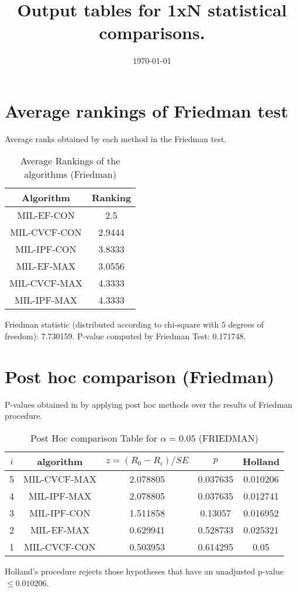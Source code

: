 \documentclass[a4paper,10pt]{article}
\title{Output tables for 1xN statistical comparisons.}
\author{}
\date{\today}
\begin{document}
\begin{landscape}
\pagestyle{empty}
\maketitle
\thispagestyle{empty}

\section{Average rankings of Friedman test}


Average ranks obtained by each method in the Friedman test.

\begin{table}[!htp]
\centering
\begin{tabular}{|c|c|}\hline
Algorithm&Ranking\\\hline
MIL-EF-CON&2.5\\MIL-CVCF-CON&2.9444\\MIL-IPF-CON&3.8333\\MIL-EF-MAX&3.0556\\MIL-CVCF-MAX&4.3333\\MIL-IPF-MAX&4.3333\\\hline\end{tabular}
\caption{Average Rankings of the algorithms (Friedman)}
\end{table}

Friedman statistic (distributed according to chi-square with 5 degrees of freedom): 7.730159. \newline P-value computed by Friedman Test: 0.171748.\newline


\newpage

\section{Post hoc comparison (Friedman)}


P-values obtained in by applying post hoc methods over the results of Friedman procedure.

\begin{table}[!htp]
\centering\footnotesize
\begin{tabular}{ccccc}
$i$&algorithm&$z=(R_0 - R_i)/SE$&$p$&Holland\\
\hline5&MIL-CVCF-MAX&2.078805&0.037635&0.010206\\4&MIL-IPF-MAX&2.078805&0.037635&0.012741\\3&MIL-IPF-CON&1.511858&0.13057&0.016952\\2&MIL-EF-MAX&0.629941&0.528733&0.025321\\1&MIL-CVCF-CON&0.503953&0.614295&0.05\\\hline
\end{tabular}
\caption{Post Hoc comparison Table for $\alpha=0.05$ (FRIEDMAN)}
\end{table}Holland's procedure rejects those hypotheses that have an unadjusted p-value $\le0.010206$.



\end{landscape}
\end{document}
